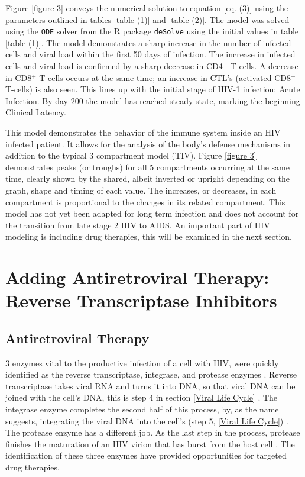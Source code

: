 \documentclass[letterpaper, 11 pt, conference]{ieeeconf}
\begin{document}
Figure \ref{figure 3} conveys the numerical solution to equation \ref{eq. (3)} using the parameters outlined in tables \ref{table (1)} and \ref{table (2)}. The model was solved using the \texttt{ODE} solver from the R package \texttt{deSolve} using the initial values in table \ref{table (1)}. The model demonstrates a sharp increase in the number of infected cells and viral load within the first 50 days of infection. The increase in infected cells and viral load is confirmed by a sharp decrease in CD4$^{+}$ T-cells. A decrease in CD8$^{+}$ T-cells occurs at the same time; an increase in CTL's (activated CD8$^{+}$ T-cells) is also seen. This lines up with the initial stage of HIV-1 infection: Acute Infection. By day 200 the model has reached steady state, marking the beginning Clinical Latency. 

This model demonstrates the behavior of the immune system inside an HIV infected patient. It allows for the analysis of the body's defense mechanisms in addition to the typical 3 compartment model (TIV). Figure \ref{figure 3} demonstrates peaks (or troughs) for all 5 compartments occurring at the same time, clearly shown by the shared, albeit inverted or upright depending on the graph, shape and timing of each value. The increases, or decreases, in each compartment is proportional to the changes in its related compartment. This model has not yet been adapted for long term infection and does not account for the transition from late stage 2 HIV to AIDS. An important part of HIV modeling is including drug therapies, this will be examined in the next section. 

\section{Adding Antiretroviral Therapy: Reverse Transcriptase Inhibitors}

\subsection{Antiretroviral Therapy}
3 enzymes vital to the productive infection of a cell with HIV, were quickly identified as the reverse transcriptase, integrase, and protease enzymes \cite{LookBack}. Reverse transcriptase takes viral RNA and turns it into DNA, so that viral DNA can be joined with the cell's DNA, this is step 4 in section \ref{Viral Life Cycle} \cite{HIVlifeCycle}. The integrase enzyme completes the second half of this process, by, as the name suggests, integrating the viral DNA into the cell's (step 5, \ref{Viral Life Cycle}) \cite{HIVlifeCycle}. The protease enzyme has a different job. As the last step in the process, protease finishes the maturation of an HIV virion that has burst from the host cell \cite{HIVlifeCycle}. The identification of these three enzymes have provided opportunities for targeted drug therapies.
\end{document}
